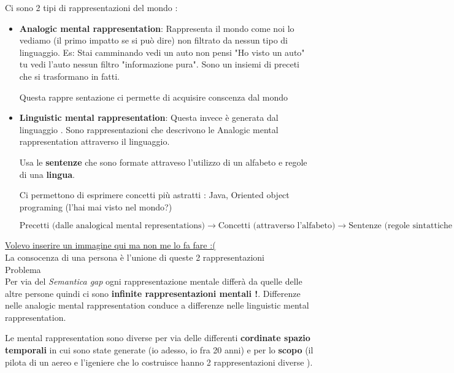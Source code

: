 \documentclass [12pt, letterpaper]{article}
\begin{document}
	Ci sono 2 tipi di rappresentazioni del mondo :
	\begin{itemize}
		
		\item \textbf{Analogic mental rappresentation}:
		Rappresenta il mondo come noi lo vediamo (il primo impatto se si può dire) non filtrato da nessun tipo di linguaggio.  Es: Stai camminando vedi un auto non pensi "Ho visto un auto" tu vedi l'auto nessun filtro "informazione pura". 
		Sono un insiemi di preceti che si trasformano in fatti.
		
		Questa rappre sentazione ci permette di acquisire conscenza dal mondo 
		
		 \item \textbf{Linguistic mental rappresentation}:
		 Questa invece è generata dal linguaggio . Sono rappresentazioni che descrivono le Analogic mental rappresentation attraverso il linguaggio.
		 
		 Usa le  \textbf{sentenze} che sono formate attraveso l'utilizzo di un alfabeto e regole di una \textbf{lingua}.
		 
		 Ci permettono di esprimere concetti più astratti : Java, Oriented object programing (l'hai mai visto nel mondo?)
		 
\[
\text{Precetti (dalle analogical mental representations)} \longrightarrow{} \text{Concetti (attraverso l'alfabeto)} \longrightarrow{} \text{Sentenze (regole sintattiche di formazione) che descrivono cosa vogliamo rappresentare (conoscenza).}
\]
		 
	\end{itemize}

	\underline{Volevo inserire un immagine qui ma non me lo fa fare :(}\\
	
	
	La consocenza di una persona è l'unione di queste 2 rappresentazioni\\
	
	
	{\large Problema}\\

	Per via del \textit{Semantica gap} ogni rappresentazione mentale differà da quelle delle altre persone quindi ci sono \textbf{infinite rappresentazioni mentali !}. Differenze nelle analogic mental rappresentation conduce a differenze nelle linguistic mental rappresentation.
	
	Le mental rappresentation sono diverse per via delle differenti \textbf{cordinate spazio temporali} in cui sono state generate (io adesso, io fra 20 anni) e per lo \textbf{scopo} (il pilota di un aereo e l'igeniere che lo costruisce hanno 2 rappresentazioni diverse ).
	
\end{document}
